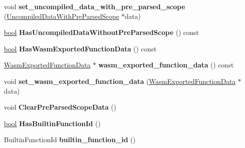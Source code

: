 \begin{DoxyCompactItemize}
void {\bfseries set\+\_\+uncompiled\+\_\+data\+\_\+with\+\_\+pre\+\_\+parsed\+\_\+scope} (\mbox{\hyperlink{classv8_1_1internal_1_1UncompiledDataWithPreParsedScope}{Uncompiled\+Data\+With\+Pre\+Parsed\+Scope}} $\ast$data)
\item 
\mbox{\label{classv8_1_1internal_1_1SharedFunctionInfo_a94ce7e012d5b169bb6a43bbfe9b3ff1f}} 
\mbox{\hyperlink{classbool}{bool}} {\bfseries Has\+Uncompiled\+Data\+Without\+Pre\+Parsed\+Scope} () const
\item 
\mbox{\label{classv8_1_1internal_1_1SharedFunctionInfo_a90cc8dd69830f193591df301e481a478}} 
\mbox{\hyperlink{classbool}{bool}} {\bfseries Has\+Wasm\+Exported\+Function\+Data} () const
\item 
\mbox{\label{classv8_1_1internal_1_1SharedFunctionInfo_a6a799620e08097aae7bc9e6f0d0c1636}} 
\mbox{\hyperlink{classv8_1_1internal_1_1WasmExportedFunctionData}{Wasm\+Exported\+Function\+Data}} $\ast$ {\bfseries wasm\+\_\+exported\+\_\+function\+\_\+data} () const
\item 
\mbox{\label{classv8_1_1internal_1_1SharedFunctionInfo_adcf0cccfa3c596e665713ebba7b0469a}} 
void {\bfseries set\+\_\+wasm\+\_\+exported\+\_\+function\+\_\+data} (\mbox{\hyperlink{classv8_1_1internal_1_1WasmExportedFunctionData}{Wasm\+Exported\+Function\+Data}} $\ast$data)
\item 
\mbox{\label{classv8_1_1internal_1_1SharedFunctionInfo_ae3795d06655a9ef7e8fcaca0385244cc}} 
void {\bfseries Clear\+Pre\+Parsed\+Scope\+Data} ()
\item 
\mbox{\label{classv8_1_1internal_1_1SharedFunctionInfo_af63617feefe1b2defe4a7633a004c7d4}} 
\mbox{\hyperlink{classbool}{bool}} {\bfseries Has\+Builtin\+Function\+Id} ()
\item 
\mbox{\label{classv8_1_1internal_1_1SharedFunctionInfo_aa692cbbeff7afd977e667765cca43f20}} 
Builtin\+Function\+Id {\bfseries builtin\+\_\+function\+\_\+id} ()
\item 

\end{DoxyCompactItemize}
